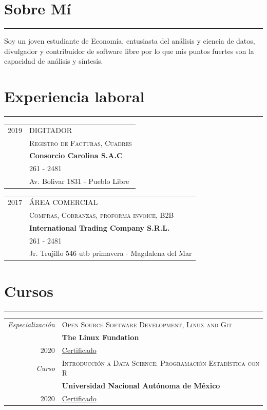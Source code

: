 \documentclass[a4paper,10pt]{article}
\begin{document}
\section{Sobre Mí}
	\hrule

	Soy un joven estudiante de Economía, entusiasta del análisis y ciencia de datos, divulgador y contribuidor de software libre por lo que mis puntos fuertes son la capacidad de análisis y síntesis.

\section{Experiencia laboral}
	\hrule
	\begin{tabular}{r|p{11cm}}
		\textsc{2019}             & \textsc{DIGITADOR}\\
				                      & \textsc{Registro de Facturas, Cuadres}\\
				                      & \textbf{Consorcio Carolina S.A.C} \\
				                      & 261 - 2481 \\
				                      & Av. Bolivar 1831 - Pueblo Libre
	\end{tabular}

	\begin{tabular}{r|p{11cm}}
		\textsc{2017}             & \textsc{ÁREA COMERCIAL}\\
				                      & \textsc{Compras, Cobranzas, proforma invoice, B2B}\\
				                      & \textbf{International Trading Company S.R.L.} \\
				                      & 261 - 2481 \\
				                      & Jr. Trujillo 546 utb primavera - Magdalena del Mar
	\end{tabular}

\newpage

\section{Cursos}
\hrule

	\begin{tabular}{r|p{11cm}}
 		\emph{Especialización}      & \textsc{Open Source Software Development, Linux and Git}\\
				                        & \textbf{The Linux Fundation}\\ 
		\textsc{2020}               & \href{https://www.coursera.org/verify/specialization/S9NNU5BM4SWU}{Certificado}\\
  	\emph{Curso}                & \textsc{Introducción a Data Science: Programación Estadística con R}\\
				                        & \textbf{Universidad Nacional Autónoma de México}\\
		\textsc{2020}               & \href{https://www.coursera.org/verify/V6A9ZS2CMAP2}{Certificado}\\
	\end{tabular}
\end{document}
